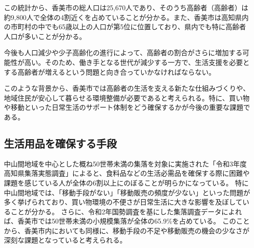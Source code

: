 
この統計から、香美市の総人口は25,670人であり、そのうち高齢者（高齢者）は約9,800人で全体の4割近くを占めていることが分かる。また、香美市は高知県内の市町村の中でも65歳以上の人口が第5位に位置しており、県内でも特に高齢者人口が多いことが分かる。

今後も人口減少や少子高齢化の進行によって、高齢者の割合がさらに増加する可能性が高い。そのため、働き手となる世代が減少する一方で、生活支援を必要とする高齢者が増えるという問題と向き合っていかなければならない。

このような背景から、香美市では高齢者の生活を支える新たな仕組みづくりや、地域住民が安心して暮らせる環境整備が必要であると考えられる。特に、買い物や移動といった日常生活のサポート体制をどう確保するかが今後の重要な課題である。



\subsection{生活用品を確保する手段}
中山間地域を中心とした概ね50世帯未満の集落を対象に実施された「令和3年度高知県集落実態調査」によると、食料品などの生活必需品を確保する際に困難や課題を感じている人が全体の6割以上にのぼることが明らかになっている。
特に中山間地域では、「移動手段がない」「移動販売の頻度が少ない」といった問題が多く挙げられており、買い物環境の不便さが日常生活に大きな影響を及ぼしていることが分かる。
さらに、令和2年国勢調査を基にした集落調査データによれば、香美市では50世帯未満の小規模集落が全体の65.9\%を占めている。
このことから、香美市内においても同様に、移動手段の不足や移動販売の機会の少なさが深刻な課題となっていると考えられる。



